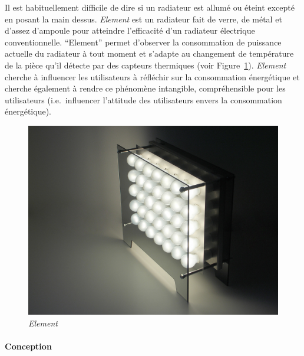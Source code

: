 \documentclass[10pt,a5paper,twoside]{article}
\begin{document}
Il est habituellement difficile de dire si un radiateur est allumé ou
éteint excepté en posant la main dessus. \emph{Element} est un radiateur
fait de verre, de métal et d'assez d'ampoule pour atteindre l'efficacité
d'un radiateur électrique conventionnelle. ``Element'' permet d'observer
la consommation de puissance actuelle du radiateur à tout moment et
s'adapte au changement de température de la pièce qu'il détecte par des
capteurs thermiques (voir Figure~\ref{fig:element1}). \emph{Element}
cherche à influencer les utilisateurs à réfléchir sur la consommation
énergétique et cherche également à rendre ce phénomène intangible,
compréhensible pour les utilisateurs (i.e.~influencer l'attitude des
utilisateurs envers la consommation énergétique).

\begin{figure}
\centering
\includegraphics[]{images/element-screenshot1.jpg}
\caption{\emph{Element}}\label{fig:element1}
\end{figure}

\paragraph{Conception}\label{conception-7}
\end{document}
